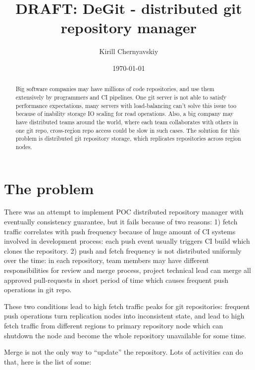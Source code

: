 \documentclass[12pt,oneside]{article}
\date{\small\today}
\title{%
  DRAFT: DeGit - distributed git repository manager\\
  \colorbox{firebrick}{\small\sffamily\color{white}{White Paper}}}
\author{Kirill Chernyavskiy}
\begin{document}
\raggedbottom

\maketitle
\begin{abstract}
Big software companies may have millions of code repositories,
and use them extensively by programmers and CI pipelines.
One git server is not able to satisfy performance expectations,
many servers with load-balancing can't solve this issue too because
of inability storage IO scaling for read operations.
Also, a big company may have distributed teams around the world,
where each team collaborates with others in one git repo,
cross-region repo access could be slow in such cases.
The solution for this problem is distributed git repository storage,
which replicates repositories across region nodes.
\end{abstract}


\section{The problem}

There was an attempt to implement POC distributed repository manager with
eventually consistency guarantee, but it fails because of two reasons:
1) fetch traffic correlates with push frequency because of huge amount of
CI systems involved in development process: each push event usually triggers
CI build which clones the repository.
2) push and fetch frequency is not distributed uniformly over the time: in each
repository, team members may have different responsibilities for review and merge process,
project technical lead can merge all approved pull-requests in short period of time
which causes frequent push operations in git repo.

These two conditions lead to high fetch traffic peaks for git repositories:
frequent push operations turn replication nodes into inconsistent state,
and lead to high fetch traffic from different regions to primary repository node
which can shutdown the node and become the whole repository unavailable for some time.

Merge is not the only way to ``update'' the repository. Lots of activities can do that,
here is the list of some:
\end{document}
